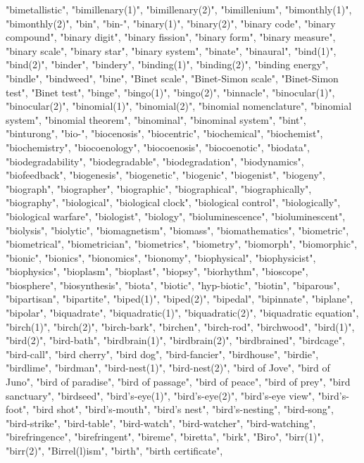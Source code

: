 "bimetallistic",
"bimillenary(1)",
"bimillenary(2)",
"bimillenium",
"bimonthly(1)",
"bimonthly(2)",
"bin",
"bin-",
"binary(1)",
"binary(2)",
"binary code",
"binary compound",
"binary digit",
"binary fission",
"binary form",
"binary measure",
"binary scale",
"binary star",
"binary system",
"binate",
"binaural",
"bind(1)",
"bind(2)",
"binder",
"bindery",
"binding(1)",
"binding(2)",
"binding energy",
"bindle",
"bindweed",
"bine",
"Binet scale",
"Binet-Simon scale",
"Binet-Simon test",
"Binet test",
"binge",
"bingo(1)",
"bingo(2)",
"binnacle",
"binocular(1)",
"binocular(2)",
"binomial(1)",
"binomial(2)",
"binomial nomenclature",
"binomial system",
"binomial theorem",
"binominal",
"binominal system",
"bint",
"binturong",
"bio-",
"biocenosis",
"biocentric",
"biochemical",
"biochemist",
"biochemistry",
"biocoenology",
"biocoenosis",
"biocoenotic",
"biodata",
"biodegradability",
"biodegradable",
"biodegradation",
"biodynamics",
"biofeedback",
"biogenesis",
"biogenetic",
"biogenic",
"biogenist",
"biogeny",
"biograph",
"biographer",
"biographic",
"biographical",
"biographically",
"biography",
"biological",
"biological clock",
"biological control",
"biologically",
"biological warfare",
"biologist",
"biology",
"bioluminescence",
"bioluminescent",
"biolysis",
"biolytic",
"biomagnetism",
"biomass",
"biomathematics",
"biometric",
"biometrical",
"biometrician",
"biometrics",
"biometry",
"biomorph",
"biomorphic",
"bionic",
"bionics",
"bionomics",
"bionomy",
"biophysical",
"biophysicist",
"biophysics",
"bioplasm",
"bioplast",
"biopsy",
"biorhythm",
"bioscope",
"biosphere",
"biosynthesis",
"biota",
"biotic",
"hyp-biotic",
"biotin",
"biparous",
"bipartisan",
"bipartite",
"biped(1)",
"biped(2)",
"bipedal",
"bipinnate",
"biplane",
"bipolar",
"biquadrate",
"biquadratic(1)",
"biquadratic(2)",
"biquadratic equation",
"birch(1)",
"birch(2)",
"birch-bark",
"birchen",
"birch-rod",
"birchwood",
"bird(1)",
"bird(2)",
"bird-bath",
"birdbrain(1)",
"birdbrain(2)",
"birdbrained",
"birdcage",
"bird-call",
"bird cherry",
"bird dog",
"bird-fancier",
"birdhouse",
"birdie",
"birdlime",
"birdman",
"bird-nest(1)",
"bird-nest(2)",
"bird of Jove",
"bird of Juno",
"bird of paradise",
"bird of passage",
"bird of peace",
"bird of prey",
"bird sanctuary",
"birdseed",
"bird's-eye(1)",
"bird's-eye(2)",
"bird's-eye view",
"bird's-foot",
"bird shot",
"bird's-mouth",
"bird's nest",
"bird's-nesting",
"bird-song",
"bird-strike",
"bird-table",
"bird-watch",
"bird-watcher",
"bird-watching",
"birefringence",
"birefringent",
"bireme",
"biretta",
"birk",
"Biro",
"birr(1)",
"birr(2)",
"Birrel(l)ism",
"birth",
"birth certificate",

